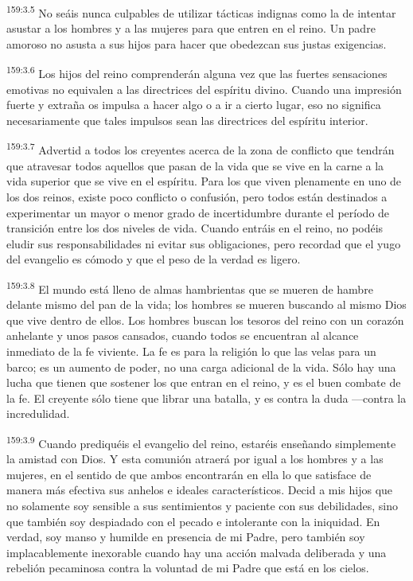 \par 
\textsuperscript{159:3.5} No seáis nunca culpables de utilizar tácticas indignas como la de intentar asustar a los hombres y a las mujeres para que entren en el reino. Un padre amoroso no asusta a sus hijos para hacer que obedezcan sus justas exigencias.

\par 
\textsuperscript{159:3.6} Los hijos del reino comprenderán alguna vez que las fuertes sensaciones emotivas no equivalen a las directrices del espíritu divino. Cuando una impresión fuerte y extraña os impulsa a hacer algo o a ir a cierto lugar, eso no significa necesariamente que tales impulsos sean las directrices del espíritu interior.

\par 
\textsuperscript{159:3.7} Advertid a todos los creyentes acerca de la zona de conflicto que tendrán que atravesar todos aquellos que pasan de la vida que se vive en la carne a la vida superior que se vive en el espíritu. Para los que viven plenamente en uno de los dos reinos, existe poco conflicto o confusión, pero todos están destinados a experimentar un mayor o menor grado de incertidumbre durante el período de transición entre los dos niveles de vida. Cuando entráis en el reino, no podéis eludir sus responsabilidades ni evitar sus obligaciones, pero recordad que el yugo del evangelio es cómodo y que el peso de la verdad es ligero.

\par 
\textsuperscript{159:3.8} El mundo está lleno de almas hambrientas que se mueren de hambre delante mismo del pan de la vida; los hombres se mueren buscando al mismo Dios que vive dentro de ellos. Los hombres buscan los tesoros del reino con un corazón anhelante y unos pasos cansados, cuando todos se encuentran al alcance inmediato de la fe viviente. La fe es para la religión lo que las velas para un barco; es un aumento de poder, no una carga adicional de la vida. Sólo hay una lucha que tienen que sostener los que entran en el reino, y es el buen combate de la fe. El creyente sólo tiene que librar una batalla, y es contra la duda ---contra la incredulidad.

\par 
\textsuperscript{159:3.9} Cuando prediquéis el evangelio del reino, estaréis enseñando simplemente la amistad con Dios. Y esta comunión atraerá por igual a los hombres y a las mujeres, en el sentido de que ambos encontrarán en ella lo que satisface de manera más efectiva sus anhelos e ideales característicos. Decid a mis hijos que no solamente soy sensible a sus sentimientos y paciente con sus debilidades, sino que también soy despiadado con el pecado e intolerante con la iniquidad. En verdad, soy manso y humilde en presencia de mi Padre, pero también soy implacablemente inexorable cuando hay una acción malvada deliberada y una rebelión pecaminosa contra la voluntad de mi Padre que está en los cielos.

